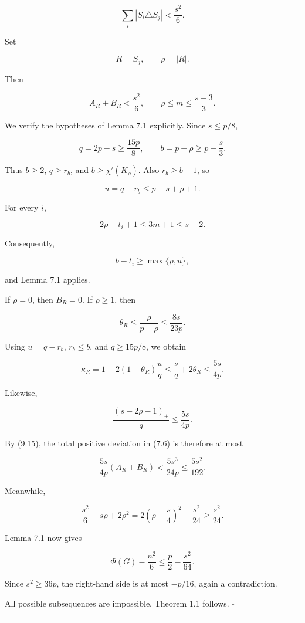 \documentclass[
  11pt,
]{article}
\begin{document}
\[
\sum_i|S_i\triangle S_j|
<
\frac{s^2}{6}.
\tag{9.14}
\]

Set

\[
R=S_j,
\qquad
\rho=|R|.
\]

Then

\[
A_R+B_R<\frac{s^2}{6},
\qquad
\rho\le m\le\frac{s-3}{3}.
\tag{9.15}
\]

We verify the hypotheses of Lemma 7.1 explicitly. Since \(s\le p/8\),

\[
q=2p-s\ge\frac{15p}{8},
\qquad
b=p-\rho\ge p-\frac s3.
\]

Thus \(b\ge2\), \(q\ge r_b\), and \(b\ge\chi'(K_\rho)\). Also \(r_b\ge b-1\), so

\[
u=q-r_b\le p-s+\rho+1.
\]

For every \(i\),

\[
2\rho+t_i+1
\le
3m+1
\le
s-2.
\]

Consequently,

\[
b-t_i\ge\max\{\rho,u\},
\]

and Lemma 7.1 applies.

If \(\rho=0\), then \(B_R=0\). If \(\rho\ge1\), then

\[
\theta_R
\le
\frac{\rho}{p-\rho}
\le
\frac{8s}{23p}.
\]

Using \(u=q-r_b\), \(r_b\le b\), and \(q\ge15p/8\), we obtain

\[
\kappa_R
=1-2(1-\theta_R)\frac uq
\le
\frac sq+2\theta_R
\le
\frac{5s}{4p}.
\tag{9.16}
\]

Likewise,

\[
\frac{(s-2\rho-1)_+}{q}
\le
\frac{5s}{4p}.
\tag{9.17}
\]

By (9.15), the total positive deviation in (7.6) is therefore at most

\[
\frac{5s}{4p}(A_R+B_R)
<
\frac{5s^3}{24p}
\le
\frac{5s^2}{192}.
\tag{9.18}
\]

Meanwhile,

\[
\frac{s^2}{6}-s\rho+2\rho^2
=
2\left(\rho-\frac s4\right)^2+\frac{s^2}{24}
\ge
\frac{s^2}{24}.
\tag{9.19}
\]

Lemma 7.1 now gives

\[
\Phi(G)-\frac{n^2}{6}
\le
\frac p2-\frac{s^2}{64}.
\tag{9.20}
\]

Since \(s^2\ge36p\), the right-hand side is at most \(-p/16\), again a contradiction.

All possible subsequences are impossible. Theorem 1.1 follows. \(\square\)

\begin{center}\rule{0.5\linewidth}{0.5pt}\end{center}
\end{document}
